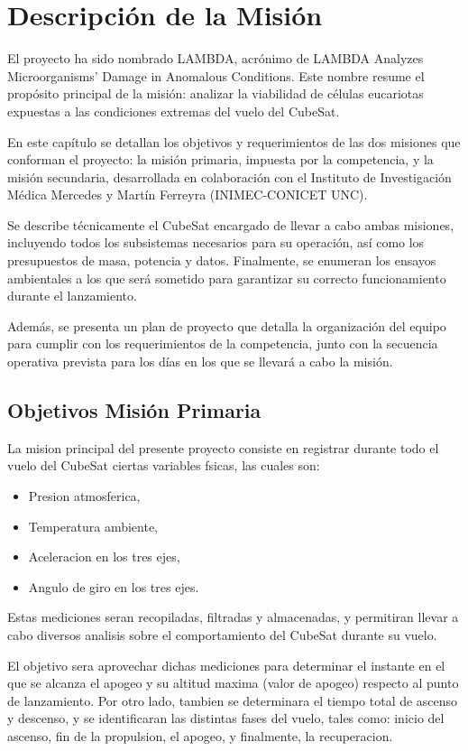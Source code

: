 \chapter{Descripción de la Misión}
El proyecto ha sido nombrado LAMBDA, acrónimo de LAMBDA Analyzes Microorganisms' Damage in
Anomalous Conditions. Este nombre resume el propósito principal de la misión: analizar la
viabilidad de células eucariotas expuestas a las condiciones extremas del vuelo del CubeSat.

En este capítulo se detallan los objetivos y requerimientos de las dos misiones que conforman el
proyecto:
la misión primaria, impuesta por la competencia, y la misión secundaria, desarrollada en
colaboración con el Instituto de Investigación Médica Mercedes y Martín Ferreyra (INIMEC-CONICET
UNC).

Se describe técnicamente el CubeSat encargado de llevar a cabo ambas misiones, incluyendo todos
los subsistemas necesarios para su operación, así como los presupuestos de masa, potencia y datos.
Finalmente, se enumeran los ensayos ambientales a los que será sometido para garantizar su
correcto funcionamiento durante el lanzamiento.

Además, se presenta un plan de proyecto que detalla la organización del equipo para cumplir con
los requerimientos de la competencia, junto con la secuencia operativa prevista para los días en
los que se llevará a cabo la misión.


\section{Objetivos Misión Primaria}
La mision principal del presente proyecto consiste en registrar durante todo el vuelo del
CubeSat ciertas variables fsicas, las cuales son:

  \begin{itemize}
    \item Presion atmosferica,
    \item Temperatura ambiente,
    \item Aceleracion en los tres ejes,
    \item Angulo de giro en los tres ejes.
  \end{itemize}

Estas mediciones seran recopiladas, filtradas y almacenadas, y permitiran llevar a cabo
diversos analisis sobre el comportamiento del CubeSat durante su vuelo.

El objetivo sera aprovechar dichas mediciones para determinar el instante en el que se
alcanza el apogeo y su altitud maxima (valor de apogeo) respecto al punto de lanzamiento.
Por otro lado, tambien se determinara el tiempo total de ascenso y descenso, y se identificaran
las distintas fases del vuelo, tales como: inicio del ascenso, fin de la propulsion, el apogeo,
y finalmente, la recuperacion.

